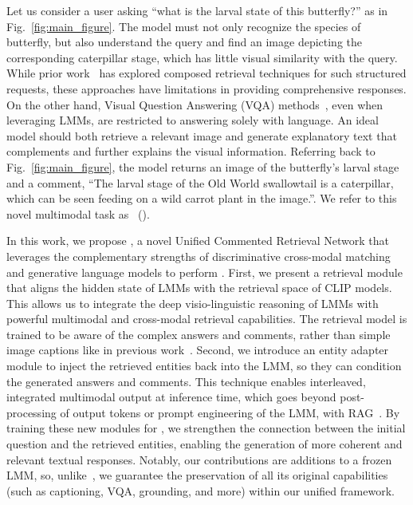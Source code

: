 %
Let us consider a user asking ``what is the larval state of this butterfly?'' as in Fig.~\ref{fig:main_figure}.
The model must not only recognize the species of butterfly, but also understand the query and find an image depicting the corresponding caterpillar stage, which has little visual similarity with the query.
%
While prior work~\cite{han2017automatic,ak2018learning,Vo_2019_CVPR, guo2018dialog,guo2019fashion, hou2021learning,chen2020image, Baldrati_2022_CVPR, Goenka_2022_CVPR} has explored composed retrieval techniques for such structured requests, these approaches have limitations in providing comprehensive responses.
On the other hand, Visual Question Answering (VQA) methods~\cite{antol2015vqa, wu2017visual, anderson2018bottom, schwenk2022okvqa, singh2019towards, shah2019kvqa, goyal2017making, gurari2018vizwiz, yan-xie-2024-echosight}, even when leveraging LMMs, are restricted to answering solely with language.
An ideal model should both retrieve a relevant image and generate explanatory text that complements and further explains the visual information.
Referring back to Fig.~\ref{fig:main_figure}, the model returns an image of the butterfly's larval stage and a comment, \eg ``The larval stage of the Old World swallowtail is a caterpillar, which can be seen feeding on a wild carrot plant in the image.''.
We refer to this novel multimodal task as \emph{\tasknametitle}~(\tasknameshort).


%
%
%
%
%
In this work, we propose \modelname, a novel Unified Commented Retrieval Network that leverages the complementary strengths of discriminative cross-modal matching and generative language models to perform \tasknameshort. 
First, we present a retrieval module that aligns the hidden state of LMMs with the retrieval space of CLIP models.
This allows us to integrate the deep visio-linguistic reasoning of LMMs with powerful multimodal and cross-modal retrieval capabilities. 
The retrieval model is trained to be aware of the complex answers and comments, rather than simple image captions like in previous work~\cite{wei2023uniir, lin2024mmembeduniversalmultimodalretrieval, jiang2024vlm2vec}.
Second, we introduce an entity adapter module to inject the retrieved entities back into the LMM, so they can condition the generated answers and comments.
This technique enables interleaved, integrated multimodal output at inference time, which goes beyond post-processing of output tokens
%
or prompt engineering of the LMM, \eg with RAG~\cite{lewis2021retrievalaugmentedgenerationknowledgeintensivenlp}.
By training these new modules for \tasknameshort, we strengthen the connection between the initial question and the retrieved entities, enabling the generation of more coherent and relevant textual responses.
Notably, our contributions are additions to a frozen LMM, so, unlike~\cite{jiang2024vlm2vec, lin2024mmembeduniversalmultimodalretrieval}, we guarantee the preservation of all its original capabilities (such as captioning, VQA, grounding, and more) within our unified framework.


